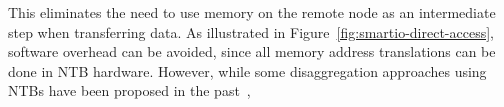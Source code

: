 %
%
This eliminates the need to use memory on the remote node as an intermediate step when transferring data.
%
As illustrated in Figure~\ref{fig:smartio-direct-access}, 
software overhead can be avoided, since all memory address translations can be done in NTB hardware.
However, while some disaggregation approaches using NTBs have been proposed in the past~\cite{Hou2013,Tu2014}, 





%



%
    
